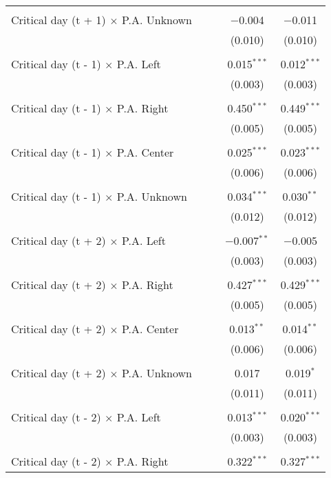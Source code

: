 \documentclass[
]{article}
\begin{document}
\begin{table}[!htbp]
{\begin{tabular}{@{\extracolsep{5pt}}lcccc}
  & & & & \\ 
 Critical day (t + 1) $\times$ P.A. Unknown &  &  & $-$0.004 & $-$0.011 \\ 
  &  &  & (0.010) & (0.010) \\ 
  & & & & \\ 
 Critical day (t - 1) $\times$ P.A. Left &  &  & 0.015$^{***}$ & 0.012$^{***}$ \\ 
  &  &  & (0.003) & (0.003) \\ 
  & & & & \\ 
 Critical day (t - 1) $\times$ P.A. Right &  &  & 0.450$^{***}$ & 0.449$^{***}$ \\ 
  &  &  & (0.005) & (0.005) \\ 
  & & & & \\ 
 Critical day (t - 1) $\times$ P.A. Center &  &  & 0.025$^{***}$ & 0.023$^{***}$ \\ 
  &  &  & (0.006) & (0.006) \\ 
  & & & & \\ 
 Critical day (t - 1) $\times$ P.A. Unknown &  &  & 0.034$^{***}$ & 0.030$^{**}$ \\ 
  &  &  & (0.012) & (0.012) \\ 
  & & & & \\ 
 Critical day (t + 2) $\times$ P.A. Left &  &  & $-$0.007$^{**}$ & $-$0.005 \\ 
  &  &  & (0.003) & (0.003) \\ 
  & & & & \\ 
 Critical day (t + 2) $\times$ P.A. Right &  &  & 0.427$^{***}$ & 0.429$^{***}$ \\ 
  &  &  & (0.005) & (0.005) \\ 
  & & & & \\ 
 Critical day (t + 2) $\times$ P.A. Center &  &  & 0.013$^{**}$ & 0.014$^{**}$ \\ 
  &  &  & (0.006) & (0.006) \\ 
  & & & & \\ 
 Critical day (t + 2) $\times$ P.A. Unknown &  &  & 0.017 & 0.019$^{*}$ \\ 
  &  &  & (0.011) & (0.011) \\ 
  & & & & \\ 
 Critical day (t - 2) $\times$ P.A. Left &  &  & 0.013$^{***}$ & 0.020$^{***}$ \\ 
  &  &  & (0.003) & (0.003) \\ 
  & & & & \\ 
 Critical day (t - 2) $\times$ P.A. Right &  &  & 0.322$^{***}$ & 0.327$^{***}$ \\ 

\end{tabular}}
\end{table}
\end{document}
